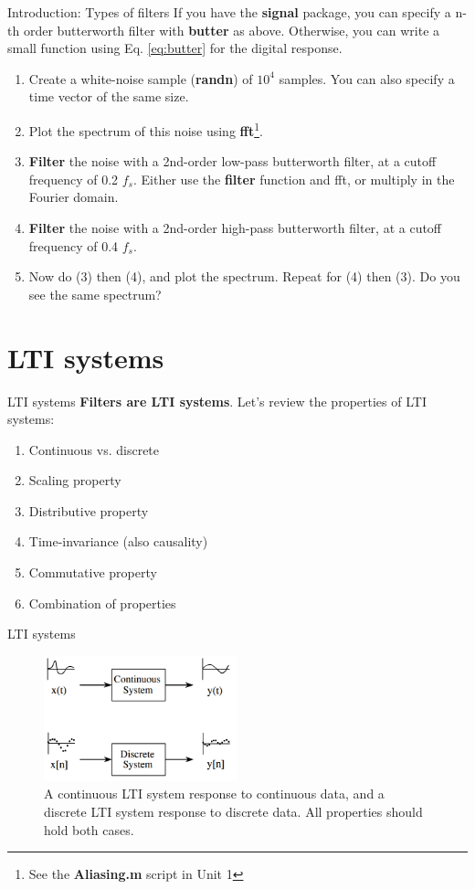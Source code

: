 \documentclass{beamer}
\begin{document}
\begin{frame}[fragile]{Introduction: Types of filters}
\small
If you have the \textbf{signal} package, you can specify a n-th order butterworth filter with \textbf{butter} as above.  Otherwise, you can write a small function using Eq. \ref{eq:butter} for the digital response.
\begin{enumerate}
\item Create a white-noise sample (\textbf{randn}) of $10^4$ samples.  You can also specify a time vector of the same size.
\item Plot the spectrum of this noise using \textbf{fft}\footnote{See the \textbf{Aliasing.m} script in Unit 1}.
\item \textbf{\alert{Filter}} the noise with a 2nd-order low-pass butterworth filter, at a cutoff frequency of 0.2 $f_s$. Either use the \textbf{filter} function and fft, or multiply in the Fourier domain.
\item \textbf{\alert{Filter}} the noise with a 2nd-order high-pass butterworth filter, at a cutoff frequency of 0.4 $f_s$.
\item Now do (3) then (4), and plot the spectrum.  Repeat for (4) then (3).  Do you see the same spectrum?
\end{enumerate}
\end{frame}

\section{LTI systems}

\begin{frame}[fragile]{LTI systems}
\textbf{Filters are LTI systems}.  Let's review the properties of LTI systems:
\begin{enumerate}
\item Continuous vs. discrete
\item Scaling property
\item Distributive property
\item Time-invariance (also causality)
\item Commutative property
\item Combination of properties
\end{enumerate}
\end{frame}

\begin{frame}{LTI systems}
\begin{figure}
\centering
\includegraphics[width=0.5\textwidth]{figures/LTI2.png}
\caption{\label{fig:LTI2} A continuous LTI system response to continuous data, and a discrete LTI system response to discrete data.  All properties should hold both cases.}
\end{figure}
\end{frame}
\end{document}

